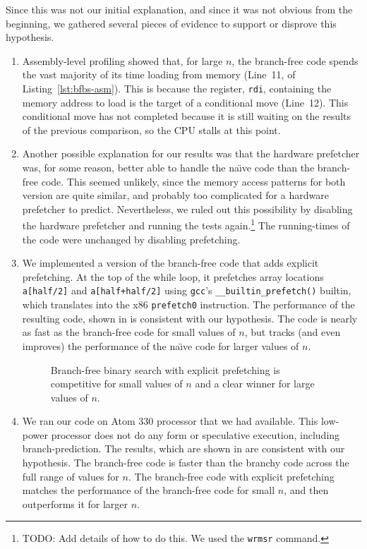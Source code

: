 \documentclass{patmorin}
\newcommand{\lstref}[1]{Listing~\ref{lst:#1}}
\begin{document}
Since this was not our initial explanation, and since it was not obvious
from the beginning, we gathered several pieces of evidence to support
or disprove this hypothesis.

\begin{enumerate}
\item Assembly-level profiling showed that, for large $n$, the
  branch-free code spends the vast majority of its time loading from
  memory (Line~11, of \lstref{bfbs-asm}).  This is because the register,
  \texttt{rdi},  containing the memory address to load is the
  target of a conditional move (Line~12).  This conditional move has not
  completed because it is still waiting on the results of the previous
  comparison, so the CPU stalls at this point.

\item Another possible explanation for our results was that the hardware
   prefetcher was, for some reason, better able to handle the na\"{\i}ve
   code than the branch-free code.  This seemed unlikely, since the memory
   access patterns for both version are quite similar, and probably too
   complicated for a hardware prefetcher to predict. Nevertheless, we
   ruled out this possibility by disabling the hardware prefetcher and
   running the tests again.\footnote{TODO: Add details of how to do this.
   We used the \texttt{wrmsr} command.}  The running-times
   of the code were unchanged by disabling prefetching.

\item We implemented a version of the branch-free code that adds explicit
   prefetching. At the top of the while loop, it
   prefetches array locations \texttt{a[half/2]}
   and \texttt{a[half+half/2]} using \texttt{gcc}'s
   \texttt{__builtin_prefetch()} builtin, which translates into
   the x86 \texttt{prefetch0} instruction.  The performance of
   the resulting code, shown in  is consistent with our
   hypothesis.  The code is nearly as fast as the branch-free code for
   small values of $n$, but tracks (and even improves) the performance
   of the na\"{\i}ve code for larger values of $n$.

\begin{figure}
   \caption{Branch-free binary search with explicit prefetching is competitive
    for small values of $n$ and a clear winner for large values of $n$.}
\end{figure}

\item We ran our code on Atom 330 processor that we had available.  This
   low-power processor does not do any form or speculative
   execution, including branch-prediction.  The results, which are
   shown in  are consistent with our hypothesis.
   The branch-free code is faster than the branchy code across the full
   range of values for $n$. The branch-free code with explicit prefetching
   matches the performance of the branch-free code for small $n$, and
   then outperforms it for larger $n$.
\end{enumerate}
\end{document}
